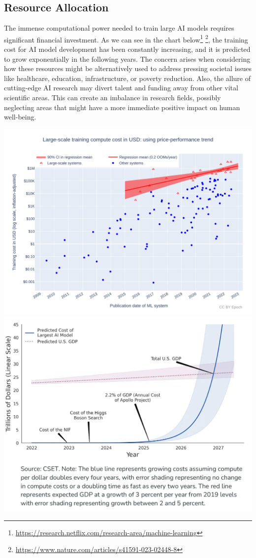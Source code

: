 \documentclass[
]{book}
\begin{document}
\hypertarget{resource-allocation}{%
\subsection{Resource Allocation}\label{resource-allocation}}

The immense computational power needed to train large AI models requires significant financial investment. As we can see in the chart below\footnote{\url{https://research.netflix.com/research-area/machine-learning}} \footnote{\url{https://www.nature.com/articles/s41591-023-02448-8}}, the training cost for AI model development has been constantly increasing, and it is predicted to grow exponentially in the following years. The concern arises when considering how these resources might be alternatively used to address pressing societal issues like healthcare, education, infrastructure, or poverty reduction. Also, the allure of cutting-edge AI research may divert talent and funding away from other vital scientific areas. This can create an imbalance in research fields, possibly neglecting areas that might have a more immediate positive impact on human well-being.

\includegraphics{figures/figure1.png}
\includegraphics{figures/figure2.png}
\end{document}
